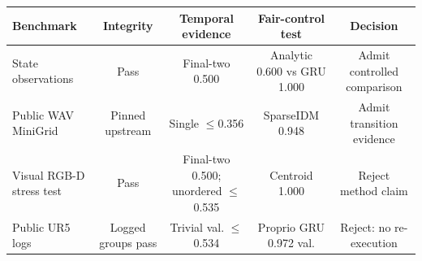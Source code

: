 \begin{tabular}{lcccc}
\toprule
Benchmark & Integrity & Temporal evidence & Fair-control test & Decision \\
\midrule
State observations & Pass & Final-two 0.500 & Analytic 0.600 vs GRU 1.000 & Admit controlled comparison \\
Public WAV MiniGrid & Pinned upstream & Single $\leq$0.356 & SparseIDM 0.948 & Admit transition evidence \\
Visual RGB-D stress test & Pass & Final-two 0.500; unordered $\leq$0.535 & Centroid 1.000 & Reject method claim \\
Public UR5 logs & Logged groups pass & Trivial val. $\leq$0.534 & Proprio GRU 0.972 val. & Reject: no re-execution \\
\bottomrule
\end{tabular}
